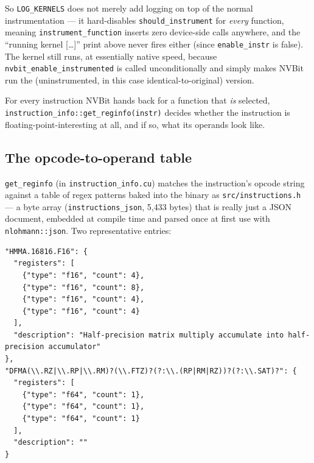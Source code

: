 \documentclass[11pt]{article}
\begin{document}
So \texttt{LOG\_KERNELS} does not merely add logging on top of the normal
instrumentation --- it hard-disables \texttt{should\_instrument} for
\emph{every} function, meaning \texttt{instrument\_function} inserts zero
device-side calls anywhere, and the ``running kernel [\ldots]'' print above
never fires either (since \texttt{enable\_instr} is false). The kernel
still runs, at essentially native speed, because
\texttt{nvbit\_enable\_instrumented} is called unconditionally and simply
makes NVBit run the (uninstrumented, in this case identical-to-original)
version.

For every instruction NVBit hands back for a function that \emph{is}
selected, \texttt{instruction\_info::get\_reginfo(instr)} decides whether
the instruction is floating-point-interesting at all, and if so, what its
operands look like.

\subsection{The opcode-to-operand table}

\texttt{get\_reginfo} (in \texttt{instruction\_info.cu}) matches the
instruction's opcode string against a table of regex patterns baked into
the binary as \texttt{src/instructions.h} --- a byte array
(\texttt{instructions\_json}, 5{,}433 bytes) that is really just a JSON
document, embedded at compile time and parsed once at first use with
\texttt{nlohmann::json}. Two representative entries:

\begin{lstlisting}
"HMMA.16816.F16": {
  "registers": [
    {"type": "f16", "count": 4},
    {"type": "f16", "count": 8},
    {"type": "f16", "count": 4},
    {"type": "f16", "count": 4}
  ],
  "description": "Half-precision matrix multiply accumulate into half-precision accumulator"
},
"DFMA(\\.RZ|\\.RP|\\.RM)?(\\.FTZ)?(?:\\.(RP|RM|RZ))?(?:\\.SAT)?": {
  "registers": [
    {"type": "f64", "count": 1},
    {"type": "f64", "count": 1},
    {"type": "f64", "count": 1}
  ],
  "description": ""
}
\end{lstlisting}
\end{document}
